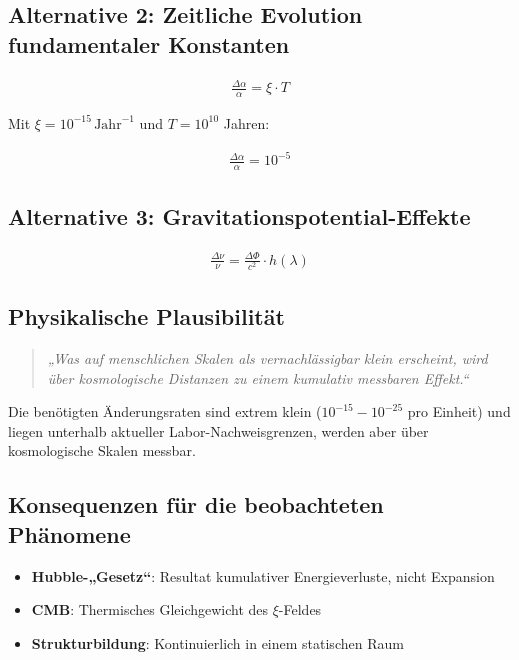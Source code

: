 \documentclass{article}
\begin{document}
\subsection{Alternative 2: Zeitliche Evolution fundamentaler Konstanten}

\begin{align}
	\frac{\Delta\alpha}{\alpha} = \xi \cdot T
\end{align}

Mit $\xi = 10^{-15} \, \text{Jahr}^{-1}$ und $T = 10^{10}$ Jahren:

\begin{align}
	\frac{\Delta\alpha}{\alpha} = 10^{-5}
\end{align}

\subsection{Alternative 3: Gravitationspotential-Effekte}

\begin{align}
	\frac{\Delta\nu}{\nu} = \frac{\Delta\Phi}{c^2} \cdot h(\lambda)
\end{align}

\subsection{Physikalische Plausibilität}

\begin{quote}
	\textit{„Was auf menschlichen Skalen als vernachlässigbar klein erscheint, wird über kosmologische Distanzen zu einem kumulativ messbaren Effekt.“}
\end{quote}

Die benötigten Änderungsraten sind extrem klein ($10^{-15} - 10^{-25}$ pro Einheit) und liegen unterhalb aktueller Labor-Nachweisgrenzen, werden aber über kosmologische Skalen messbar.

\subsection{Konsequenzen für die beobachteten Phänomene}

\begin{itemize}
	\item \textbf{Hubble-„Gesetz“}: Resultat kumulativer Energieverluste, nicht Expansion
	\item \textbf{CMB}: Thermisches Gleichgewicht des $\xi$-Feldes
	\item \textbf{Strukturbildung}: Kontinuierlich in einem statischen Raum
\end{itemize}
\end{document}
